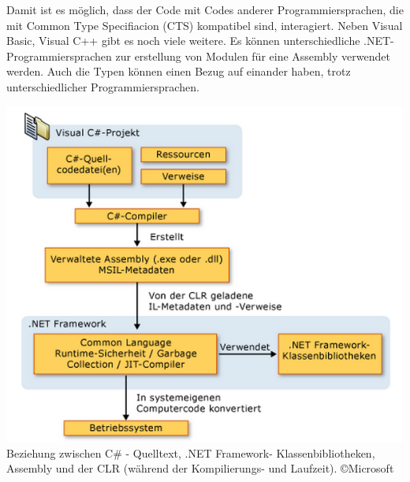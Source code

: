 \documentclass[12pt,a4paper]{report}
\begin{document}
\begin{onehalfspace}
Damit ist es möglich, dass der Code mit Codes anderer Programmiersprachen, die mit Common Type Specifiacion (CTS) kompatibel sind, interagiert. Neben Visual Basic, Visual C++ gibt es noch viele weitere. Es können unterschiedliche .NET- Programmiersprachen zur erstellung von Modulen für eine Assembly verwendet werden. Auch die Typen können einen Bezug auf einander haben, trotz unterschiedlicher Programmiersprachen.
\begin{center}
\includegraphics[scale=0.8]{img/uebersetzung.png}\\
Beziehung zwischen C\# - Quelltext, .NET Framework- Klassenbibliotheken, Assembly und der CLR (während der Kompilierungs- und Laufzeit).
\copyright Microsoft
\end{center}



\end{onehalfspace}
\end{document}

